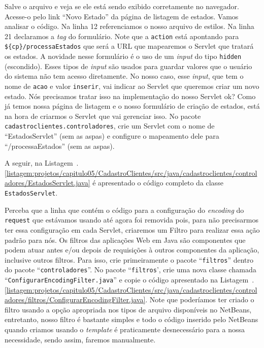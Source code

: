 Salve o arquivo e veja se ele está sendo exibido corretamente no navegador. Acesse-o pelo link ``Novo Estado'' da página de listagem de estados. Vamos analisar o código. Na linha 12 referenciamos o nosso arquivo de estilos. Na linha 21 declaramos a \textit{tag} do formulário. Note que a \texttt{action} está apontando para \texttt{\$\{cp\}/processaEstados} que será a URL que mapearemos o Servlet que tratará os estados. A novidade nesse formulário é o uso de um \textit{input} do tipo \texttt{hidden} (escondido). Esses tipos de \textit{input} são usados para guardar valores que o usuário do sistema não tem acesso diretamente. No nosso caso, esse \textit{input}, que tem o nome de \texttt{acao} e valor \texttt{inserir}, vai indicar ao Servlet que queremos criar um novo estado. Nós precisamos tratar isso na implementação do nosso Servlet ok? Como já temos nossa página de listagem e o nosso formulário de criação de estados, está na hora de criarmos o Servlet que vai gerenciar isso. No pacote \texttt{cadastroclientes.controladores}, crie um Servlet com o nome de ``EstadosServlet'' (sem as aspas) e configure o mapeamento dele para ``/processaEstados'' (sem as aspas).

A seguir, na Listagem~\thechapter.\ref{listagem:projetos/capitulo05/CadastroClientes/src/java/cadastroclientes/controladores/EstadosServlet.java} é apresentado o código completo da classe \texttt{EstadosServlet}.


Perceba que a linha que contém o código para a configuração do \textit{encoding} do \texttt{request} que estávamos usando até agora foi removida pois, para não precisarmos ter essa configuração em cada Servlet, criaremos um Filtro para realizar essa ação padrão para nós. Os filtros das aplicações Web em Java são componentes que podem atuar antes e/ou depois de requisições à outros componentes da aplicação, inclusive outros filtros. Para isso, crie primeiramente o pacote ``\texttt{filtros}'' dentro do pacote\linebreak%
``\texttt{controladores}''. No pacote ``\texttt{filtros}', crie uma nova classe chamada\linebreak%
``\texttt{ConfigurarEncodingFilter.java}'' e copie o código apresentado na Listagem~\thechapter.\ref{listagem:projetos/capitulo05/CadastroClientes/src/java/cadastroclientes/controladores/filtros/ConfigurarEncodingFilter.java}. Note que poderíamos ter criado o filtro usando a opção apropriada nos tipos de arquivo disponíveis no NetBeans, entretanto, nosso filtro é bastante simples e todo o código inserido pelo NetBeans quando criamos usando o \textit{template} é praticamente desnecessário para a nossa necessidade, sendo assim, faremos manualmente.

